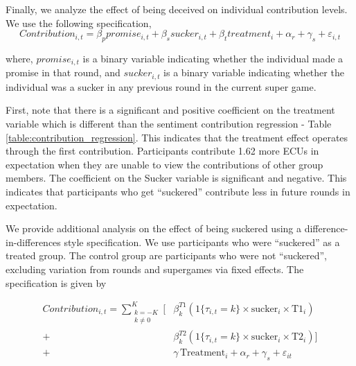 \documentclass[12pt,letterpaper,english]{article}
\begin{document}
Finally, we analyze the effect of being deceived on individual contribution levels. We use the following specification,
\begin{equation}
    Contribution_{i,t} = \beta_p promise_{i,t} + \beta_s sucker_{i,t} + \beta_t treatment_{i} + \alpha_r + \gamma_s + \varepsilon_{i,t}
\label{eq:contribution_regression}
\end{equation}

where, $promise_{i,t}$ is a binary variable indicating whether the individual made
a promise in that round, and $sucker_{i,t}$ is a binary variable indicating whether the individual was a sucker in any previous round in the current super game.

First, note that there is a significant and positive coefficient on the treatment variable which is different
than the sentiment contribution regression - Table \ref{table:contribution_regression}. This indicates that the treatment effect operates through the first contribution.
Participants contribute 1.62 more ECUs in expectation when they are unable to view the contributions of other group members. The
coefficient on the Sucker variable is significant and negative. This indicates that participants who get ``suckered''
contribute less in future rounds in expectation.

We provide additional analysis on the effect of being suckered using a difference-in-differences style specification.
We use participants who were ``suckered'' as a treated group. The control group are participants who were not ``suckered'',
excluding variation from rounds and supergames via fixed effects. The specification is given by

\begin{equation}
\begin{split}
    Contribution_{i,t} = \sum_{\substack{k = -K \\ k \neq 0}}^{K} \Big[ &\beta_k^{T1} \left( 1\{\tau_{i,t} = k\} \times \text{sucker}_i \times \text{T1}_i \right) \\
    + &\beta_k^{T2} \left( 1\{\tau_{i,t} = k\} \times \text{sucker}_i \times \text{T2}_i \right) \Big] \\
    + &\gamma \, \text{Treatment}_i + \alpha_r + \gamma_s + \varepsilon_{it}
\end{split}
\label{eq:did_contribution}
\end{equation}
\end{document}
